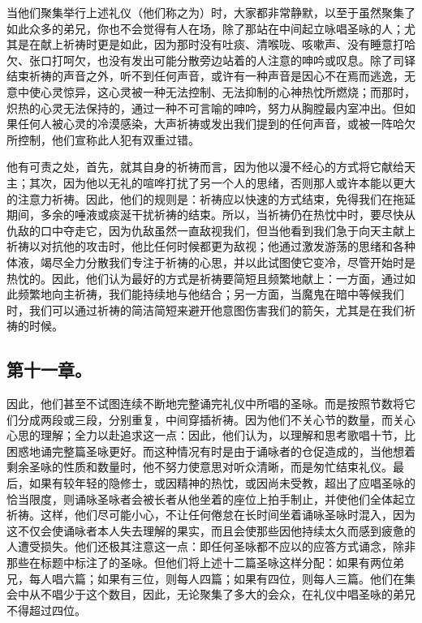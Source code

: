 \par

当他们聚集举行上述礼仪（他们称之为）时，大家都非常静默，以至于虽然聚集了如此众多的弟兄，你也不会觉得有人在场，除了那站在中间起立咏唱圣咏的人；尤其是在献上祈祷时更是如此，因为那时没有吐痰、清喉咙、咳嗽声、没有睡意打哈欠、张口打呵欠，也没有发出可能分散旁边站着的人注意的呻吟或叹息。除了司铎结束祈祷的声音之外，听不到任何声音，或许有一种声音是因心不在焉而逃逸，无意中使心灵惊异，这心灵被一种无法控制、无法抑制的心神热忱所燃烧；而那时，炽热的心灵无法保持的，通过一种不可言喻的呻吟，努力从胸膛最内室冲出。但如果任何人被心灵的冷漠感染，大声祈祷或发出我们提到的任何声音，或被一阵哈欠所控制，他们宣称此人犯有双重过错。\par

他有可责之处，首先，就其自身的祈祷而言，因为他以漫不经心的方式将它献给天主；其次，因为他以无礼的喧哗打扰了另一个人的思绪，否则那人或许本能以更大的注意力祈祷。因此，他们的规则是：祈祷应以快速的方式结束，免得我们在拖延期间，多余的唾液或痰涎干扰祈祷的结束。所以，当祈祷仍在热忱中时，要尽快从仇敌的口中夺走它，因为仇敌虽然一直敌视我们，但当他看到我们急于向天主献上祈祷以对抗他的攻击时，他比任何时候都更为敌视；他通过激发游荡的思绪和各种体液，竭尽全力分散我们专注于祈祷的心思，并以此试图使它变冷，尽管开始时是热忱的。因此，他们认为最好的方式是祈祷要简短且频繁地献上：一方面，通过如此频繁地向主祈祷，我们能持续地与他结合；另一方面，当魔鬼在暗中等候我们时，我们可以通过祈祷的简洁简短来避开他意图伤害我们的箭矢，尤其是在我们祈祷的时候。\par


\subsection{第十一章。}

\par

因此，他们甚至不试图连续不断地完整诵完礼仪中所唱的圣咏。而是按照节数将它们分成两段或三段，分别重复，中间穿插祈祷。因为他们不关心节的数量，而关心心思的理解；全力以赴追求这一点：因此，他们认为，以理解和思考歌唱十节，比困惑地诵完整篇圣咏更好。而这种情况有时是由于诵咏者的仓促造成的，当他想着剩余圣咏的性质和数量时，他不努力使意思对听众清晰，而是匆忙结束礼仪。最后，如果有较年轻的隐修士，或因精神的热忱，或因尚未受教，超出了应唱圣咏的恰当限度，则诵咏圣咏者会被长者从他坐着的座位上拍手制止，并使他们全体起立祈祷。这样，他们尽可能小心，不让任何倦怠在长时间坐着诵咏圣咏时混入，因为这不仅会使诵咏者本人失去理解的果实，而且会使那些因他持续太久而感到疲惫的人遭受损失。他们还极其注意这一点：即任何圣咏都不应以的应答方式诵念，除非那些在标题中标注了的圣咏。但他们将上述十二篇圣咏这样分配：如果有两位弟兄，每人唱六篇；如果有三位，则每人四篇；如果有四位，则每人三篇。他们在集会中从不唱少于这个数目，因此，无论聚集了多大的会众，在礼仪中唱圣咏的弟兄不得超过四位。\par

